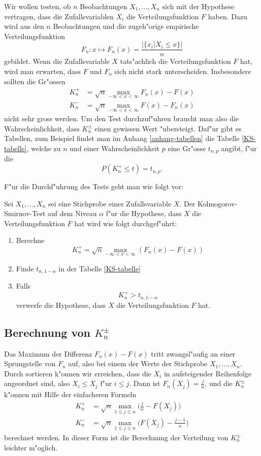 Wir wollen testen, ob $n$ Beobachtungen $X_1,\dots,X_n$ sich mit
der Hypothese vertragen, dass die Zufallsvariablen $X_i$ die
Verteilungsfunktion $F$ haben.
Dazu wird aus den $n$ Beobachtungen
und die zugeh"orige empirische Verteilungsfunktion
\[
F_n\colon x\mapsto F_n(x)=\frac{|\{x_i|X_i\le x\}|}{n}
\]
gebildet.
Wenn die Zufallsvariable $X$ tats"achlich die
Verteilungsfunktion $F$ hat, wird man erwarten,
dass $F$ und $F_n$ sich nicht stark unterscheiden.
Insbesondere sollten die Gr"ossen
\begin{align}
K_n^+
&=
\sqrt{n}\max_{-\infty<x<\infty} F_n(x)-F(x)
\\
K_n^-
&=
\sqrt{n}\max_{-\infty<x<\infty} F(x)-F_n(x)
\end{align}
nicht sehr gross werden.
Um den Test durchzuf"uhren braucht man also
die Wahrscheinlichkeit, dass $K_n^{\pm}$ einen gewissen Wert "ubersteigt.
Daf"ur gibt es Tabellen, zum Beispiel findet man im Anhang \ref{anhang-tabellen}
die Tabelle \ref{KS-tabelle}, welche zu $n$ und einer Wahrscheinlichkeit
$p$ eine Gr"osse $t_{n,p}$ angibt, f"ur die
\[
P(K_n^+\le t)=t_{n,p}.
\]

F"ur die Durchf"uhrung des Tests geht man wie folgt vor:
\begin{satz} Sei $X_1,\dots,X_n$ sei eine Stichprobe einer Zufallsvariable $X$.
Der Kolmogorov-Smirnov-Test auf dem Niveau $\alpha$ f"ur die Hypothese,
dass $X$ die Verteilungsfunktion $F$ hat wird wie folgt durchgef"uhrt:
\begin{enumerate}
\item Berechne
\[
K_n^+ = \sqrt{n}\max_{-\infty<x<\infty} (F_n(x)-F(x))
\]
\item Finde $t_{n,1-\alpha}$ in der Tabelle \ref{KS-tabelle}
\item Falls
\[
K_n^+>t_{n,1-\alpha}
\]
verwerfe die Hypothese, dass $X$ die Verteilungsfunktion $F$ hat.
\end{enumerate}
\end{satz}

\subsection{Berechnung von \texorpdfstring{$K_n^{\pm}$}{Kn-plus-minus}}
Das Maximum der Differenz $F_n(x)-F(x)$ tritt zwangsl"aufig an einer
Sprungstelle von $F_n$ auf, also bei einem der Werte der Stichprobe
$X_1,\dots,X_n$.
Durch sortieren k"onnen wir erreichen, dass die
$X_i$  in aufsteigender Reihenfolge angeordnet sind, also $X_i\le X_j$
f"ur $i\le j$.
Dann ist $F_n(X_j)=\frac{j}{n}$, und
die  $K_n^{\pm}$ k"onnen mit Hilfe der einfacheren Formeln
\begin{align}
K_n^+
&=
\sqrt{n}\max_{1\le j\le n}\biggl(\frac{j}{n}-F(X_j)\biggr)
\label{knp-berechnungs-formel}
\\
K_n^-
&=
\sqrt{n}\max_{1\le j\le n}\biggl(F(X_j)-\frac{j-1}n\biggr)
\end{align}
berechnet werden.
In dieser Form ist die Berechnung der
Verteilung von $K_n^{\pm}$ leichter m"oglich.


